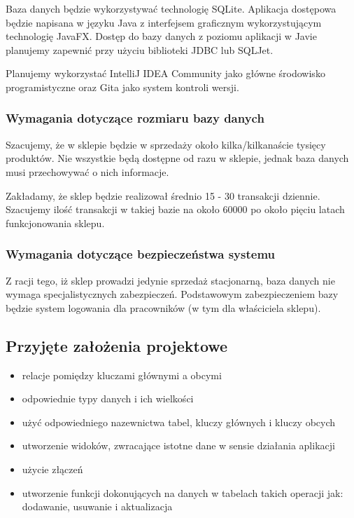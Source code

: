 Baza danych będzie wykorzystywać technologię SQLite. Aplikacja dostępowa będzie napisana w języku Java z interfejsem graficznym wykorzystującym technologię JavaFX. Dostęp do bazy danych z poziomu aplikacji w Javie planujemy zapewnić przy użyciu biblioteki JDBC lub SQLJet.

Planujemy wykorzystać IntelliJ IDEA Community jako główne środowisko programistyczne oraz Gita jako system kontroli wersji.

\subsubsection{Wymagania dotyczące rozmiaru bazy danych}

Szacujemy, że w sklepie będzie w sprzedaży około kilka/kilkanaście tysięcy produktów. Nie wszystkie będą dostępne od razu w sklepie, jednak baza danych musi przechowywać o nich informacje.

Zakładamy, że sklep będzie realizował średnio 15 - 30 transakcji dziennie. Szacujemy ilość transakcji w takiej bazie na około 60000 po około pięciu latach funkcjonowania sklepu.

\subsubsection{Wymagania dotyczące bezpieczeństwa systemu}

Z racji tego, iż sklep prowadzi jedynie sprzedaż stacjonarną, baza danych nie wymaga specjalistycznych zabezpieczeń. Podstawowym zabezpieczeniem bazy będzie system logowania dla pracowników (w tym dla właściciela sklepu).

\subsection{Przyjęte założenia projektowe}

\begin{itemize}
	
	\item relacje pomiędzy kluczami głównymi a obcymi
	
	\item odpowiednie typy danych i ich wielkości
	
	\item użyć odpowiedniego nazewnictwa tabel, kluczy głównych i kluczy obcych
	
	\item utworzenie widoków, zwracające istotne dane w sensie działania aplikacji
	
	\item użycie złączeń
	
	\item utworzenie funkcji dokonujących na danych w tabelach takich operacji jak: dodawanie, usuwanie i aktualizacja
	
\end{itemize}

